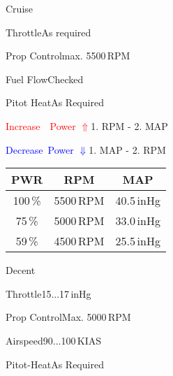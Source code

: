 \begin{checklist}{Cruise}
  \item{Throttle}{As required}
  \item{Prop Control}{max. 5500\,RPM}
  \item{Fuel Flow}{Checked}
  \item{Pitot Heat}{As Required}

  \item{\textcolor{red}{Increase~~Power $\Uparrow$}}{1. RPM - 2. MAP}
  \item{\textcolor{blue}{Decrease~Power $\Downarrow$}}{1. MAP - 2. RPM}
    
\end{checklist}

\begin{table}[!ht]
  \large
  \centering
  \begin{tabular}{|c|c|c|}
  \hline
  \cellcolor{black!90}\color{white}\textbf{PWR} & \cellcolor{black!90}\color{white}\textbf{RPM}  & \cellcolor{black!90}\color{white}\textbf{MAP} \\ \hline

  100\,\% & 5500\,RPM & 40.5\,inHg \\ \hline
  75\,\% & 5000\,RPM & 33.0\,inHg \\ \hline
  59\,\% & 4500\,RPM & 25.5\,inHg \\ \hline

  \end{tabular}
\end{table}


\begin{checklist}{Decent}
  \item{Throttle}{15...17\,inHg}
  \item{Prop Control}{Max. 5000\,RPM}
  \item{Airspeed}{90...100\,KIAS}
  \item{Pitot-Heat}{As Required}
\end{checklist}

